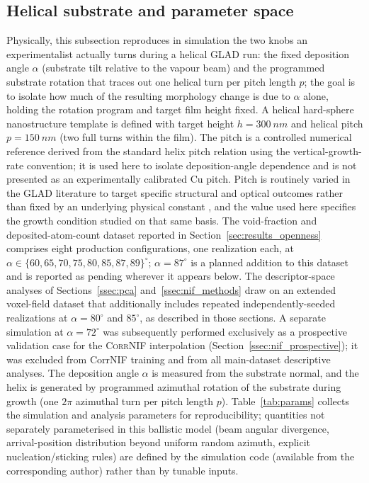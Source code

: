 \documentclass[aip,amsmath,amssymb,reprint]{revtex4-1}
\newcommand{\dang}{\ensuremath{\alpha}}
\begin{document}
\subsection{Helical substrate and parameter space}
\label{ssec:params}

Physically, this subsection reproduces in simulation the two knobs an
experimentalist actually turns during a helical GLAD run: the fixed
deposition angle $\dang$ (substrate tilt relative to the vapour beam) and
the programmed substrate rotation that traces out one helical turn per
pitch length $p$; the goal is to isolate how much of the resulting
morphology change is due to $\dang$ alone, holding the rotation program
and target film height fixed. A helical hard-sphere nanostructure template
is defined with target height
$h = \SI{300}{nm}$ and helical pitch $p = \SI{150}{nm}$ (two full
turns within the film).  The pitch is a controlled numerical reference
derived from the standard helix pitch relation using the vertical-growth-rate
convention; it is used here to isolate deposition-angle dependence and is
not presented as an experimentally calibrated Cu pitch. Pitch is routinely
varied in the GLAD literature to target specific structural and optical
outcomes rather than fixed by an underlying physical constant
\citep{park2009pitch}, and the value used here specifies the growth
condition studied on that same basis.
The void-fraction and deposited-atom-count dataset reported in
Section~\ref{sec:results_openness} comprises eight production
configurations, one realization each, at $\dang \in \{60, 65, 70, 75, 80,
85, 87, 89\}^{\circ}$; $\dang = 87^{\circ}$ is a planned addition to this
dataset and is reported as pending wherever it appears below. The
descriptor-space analyses of Sections~\ref{ssec:pca}
and~\ref{ssec:nif_methods} draw on an extended voxel-field dataset that
additionally includes repeated independently-seeded realizations at
$\dang = 80^{\circ}$ and $85^{\circ}$, as described in those sections.
A separate simulation at $\dang = 72^{\circ}$ was subsequently performed
exclusively as a prospective validation case for the \textsc{CorrNIF}
interpolation (Section~\ref{ssec:nif_prospective}); it was excluded from
CorrNIF training and from all main-dataset descriptive analyses.
The deposition angle $\dang$ is measured from the substrate normal, and the
helix is generated by programmed azimuthal rotation of the substrate during
growth (one $2\pi$ azimuthal turn per pitch length $p$).
Table~\ref{tab:params} collects the simulation and analysis parameters for
reproducibility; quantities not separately parameterised in this ballistic
model (beam angular divergence, arrival-position distribution beyond uniform
random azimuth, explicit nucleation/sticking rules) are defined by the
simulation code (available from the corresponding author) rather than by tunable inputs.
\end{document}
